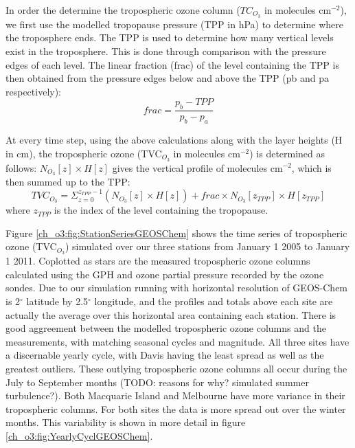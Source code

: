     In order the determine the tropospheric ozone column ($TC_{O_3}$ in molecules cm$^{-2}$), we first use the modelled tropopause pressure (TPP in hPa) to determine where the troposphere ends.
    The TPP is used to determine how many vertical levels exist in the troposphere.
    This is done through comparison with the pressure edges of each level.
    The linear fraction (frac) of the level containing the TPP is then obtained from the pressure edges below and above the TPP (pb and pa respectively):
    \begin{equation*}
     frac = \frac{p_b - TPP}{p_b-p_a}
    \end{equation*}
    
    At every time step, using the above calculations along with the layer heights (H in cm), the tropospheric ozone (TVC$_{O_3}$ in molecules cm$^{-2}$) is determined as follows: $N_{O_3}[z] \times H[z]$ gives the vertical profile of molecules cm$^{-2}$, which is then summed up to the TPP:
    \begin{equation*}
     TVC_{O_3} = \Sigma_{z=0}^{z_{TPP}-1} \left( N_{O_3}[z] \times H[z] \right) + frac \times N_{O_3}[z_{TPP}] \times H[z_{TPP}]
    \end{equation*}
    where $z_{TPP}$ is the index of the level containing the tropopause.
    
    Figure \ref{ch_o3:fig:StationSeriesGEOSChem} shows the time series of tropospheric ozone (TVC$_{O_3}$) simulated over our three stations from January 1 2005 to January 1 2011.
    Coplotted as stars are the measured tropospheric ozone columns calculated using the GPH and ozone partial pressure recorded by the ozone sondes.
    Due to our simulation running with horizontal resolution of GEOS-Chem is 2$^{\circ}$ latitude by 2.5$^{\circ}$ longitude, and the profiles and totals above each site are actually the average over this horizontal area containing each station.
    There is good aggreement between the modelled tropospheric ozone columns and the measurements, with matching seasonal cycles and magnitude.
    All three sites have a discernable yearly cycle, with Davis having the least spread as well as the greatest outliers.
    These outlying tropospheric ozone columns all occur during the July to September months (TODO: reasons for why? simulated summer turbulence?).
    Both Macquarie Island and Melbourne have more variance in their tropospheric columns.
    For both sites the data is more spread out over the winter months.
    This variability is shown in more detail in figure \ref{ch_o3:fig:YearlyCyclGEOSChem}.
    
